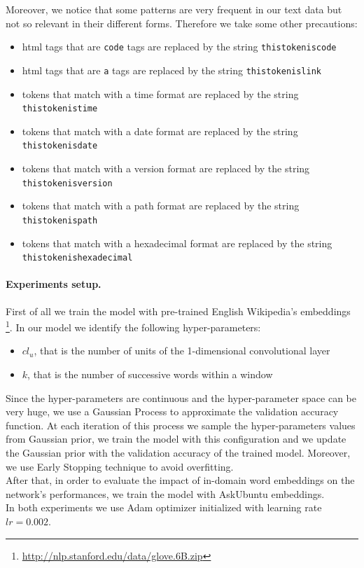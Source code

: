 \documentclass[10pt,twocolumn,letterpaper]{article}
\begin{document}
Moreover, we notice that some patterns are very frequent in our text data but not so relevant in their different forms. Therefore we take some other precautions:
\begin{itemize}
	\item html tags that are \texttt{code} tags are replaced by the string \texttt{thistokeniscode}
	\item html tags that are \texttt{a} tags are replaced by the string \texttt{thistokenislink}
	\item tokens that match with a time format are replaced by the string \texttt{thistokenistime}
	\item tokens that match with a date format are replaced by the string \texttt{thistokenisdate}
	\item tokens that match with a version format are replaced by the string \texttt{thistokenisversion}
	\item tokens that match with a path format are replaced by the string \texttt{thistokenispath}
	\item tokens that match with a hexadecimal format are replaced by the string \texttt{thistokenishexadecimal}
 \end{itemize}
 
\paragraph{Experiments setup.}
First of all we train the model with pre-trained English Wikipedia's embeddings \footnote{\url{http://nlp.stanford.edu/data/glove.6B.zip}}. In our model we identify the following hyper-parameters: 
\begin{itemize}
	\item $cl_{u}$, that is the number of units of the 1-dimensional convolutional layer
	\item $k$, that is the number of successive words within a window
\end{itemize}
Since the hyper-parameters are continuous and the hyper-parameter space can be very huge, we use a Gaussian Process to approximate the validation accuracy function. At each iteration of this process we sample the hyper-parameters values from Gaussian prior, we train the model with this configuration and we update the Gaussian prior with the validation accuracy of the trained model. Moreover, we use Early Stopping technique to avoid overfitting. \\
After that, in order to evaluate the impact of in-domain word embeddings on the network's performances, we train the model with AskUbuntu embeddings. \\
In both experiments we use Adam optimizer initialized with learning rate $ lr=0.002 $. 
\end{document}

